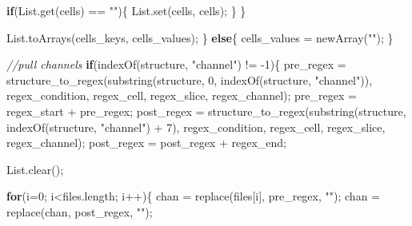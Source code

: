 \documentclass[
  12pt,
  a4paper,
]{book}
\newenvironment{Shaded}{}{}
\newcommand{\CommentTok}[1]{\textcolor[rgb]{0.38,0.63,0.69}{\textit{#1}}}
\newcommand{\ControlFlowTok}[1]{\textcolor[rgb]{0.00,0.44,0.13}{\textbf{#1}}}
\newcommand{\DecValTok}[1]{\textcolor[rgb]{0.25,0.63,0.44}{#1}}
\newcommand{\NormalTok}[1]{#1}
\newcommand{\OperatorTok}[1]{\textcolor[rgb]{0.40,0.40,0.40}{#1}}
\newcommand{\StringTok}[1]{\textcolor[rgb]{0.25,0.44,0.63}{#1}}
\begin{document}
\begin{Shaded}
\begin{Highlighting}[]
        \ControlFlowTok{if}\OperatorTok{(}\NormalTok{List}\OperatorTok{.}\NormalTok{get}\OperatorTok{(}\NormalTok{cells}\OperatorTok{)} \OperatorTok{==} \StringTok{""}\OperatorTok{)\{}
\NormalTok{            List}\OperatorTok{.}\NormalTok{set}\OperatorTok{(}\NormalTok{cells}\OperatorTok{,}\NormalTok{ cells}\OperatorTok{);}
        \OperatorTok{\}}
    \OperatorTok{\}}
    
\NormalTok{    List}\OperatorTok{.}\NormalTok{toArrays}\OperatorTok{(}\NormalTok{cells\_keys}\OperatorTok{,}\NormalTok{ cells\_values}\OperatorTok{);}
\OperatorTok{\}}
\ControlFlowTok{else}\OperatorTok{\{}
\NormalTok{    cells\_values }\OperatorTok{=}\NormalTok{ newArray}\OperatorTok{(}\StringTok{""}\OperatorTok{);}
\OperatorTok{\}}

\CommentTok{//pull channels}
\ControlFlowTok{if}\OperatorTok{(}\NormalTok{indexOf}\OperatorTok{(}\NormalTok{structure}\OperatorTok{,} \StringTok{"channel"}\OperatorTok{)} \OperatorTok{!=} \OperatorTok{{-}}\DecValTok{1}\OperatorTok{)\{}
\NormalTok{    pre\_regex }\OperatorTok{=}\NormalTok{ structure\_to\_regex}\OperatorTok{(}\NormalTok{substring}\OperatorTok{(}\NormalTok{structure}\OperatorTok{,} \DecValTok{0}\OperatorTok{,}\NormalTok{ indexOf}\OperatorTok{(}\NormalTok{structure}\OperatorTok{,} \StringTok{"channel"}\OperatorTok{)),}\NormalTok{ regex\_condition}\OperatorTok{,}\NormalTok{ regex\_cell}\OperatorTok{,}\NormalTok{ regex\_slice}\OperatorTok{,}\NormalTok{ regex\_channel}\OperatorTok{);}
\NormalTok{    pre\_regex }\OperatorTok{=}\NormalTok{ regex\_start }\OperatorTok{+}\NormalTok{ pre\_regex}\OperatorTok{;}
\NormalTok{    post\_regex }\OperatorTok{=}\NormalTok{ structure\_to\_regex}\OperatorTok{(}\NormalTok{substring}\OperatorTok{(}\NormalTok{structure}\OperatorTok{,}\NormalTok{ indexOf}\OperatorTok{(}\NormalTok{structure}\OperatorTok{,} \StringTok{"channel"}\OperatorTok{)} \OperatorTok{+} \DecValTok{7}\OperatorTok{),}\NormalTok{ regex\_condition}\OperatorTok{,}\NormalTok{ regex\_cell}\OperatorTok{,}\NormalTok{ regex\_slice}\OperatorTok{,}\NormalTok{ regex\_channel}\OperatorTok{);}
\NormalTok{    post\_regex }\OperatorTok{=}\NormalTok{ post\_regex }\OperatorTok{+}\NormalTok{ regex\_end}\OperatorTok{;}
    
\NormalTok{    List}\OperatorTok{.}\NormalTok{clear}\OperatorTok{();}
    
    \ControlFlowTok{for}\OperatorTok{(}\NormalTok{i}\OperatorTok{=}\DecValTok{0}\OperatorTok{;}\NormalTok{ i}\OperatorTok{\textless{}}\NormalTok{files}\OperatorTok{.}\NormalTok{length}\OperatorTok{;}\NormalTok{ i}\OperatorTok{++)\{}
\NormalTok{        chan }\OperatorTok{=}\NormalTok{ replace}\OperatorTok{(}\NormalTok{files}\OperatorTok{[}\NormalTok{i}\OperatorTok{],}\NormalTok{ pre\_regex}\OperatorTok{,} \StringTok{""}\OperatorTok{);}
\NormalTok{        chan }\OperatorTok{=}\NormalTok{ replace}\OperatorTok{(}\NormalTok{chan}\OperatorTok{,}\NormalTok{ post\_regex}\OperatorTok{,} \StringTok{""}\OperatorTok{);}
        

\end{Highlighting}
\end{Shaded}
\end{document}

